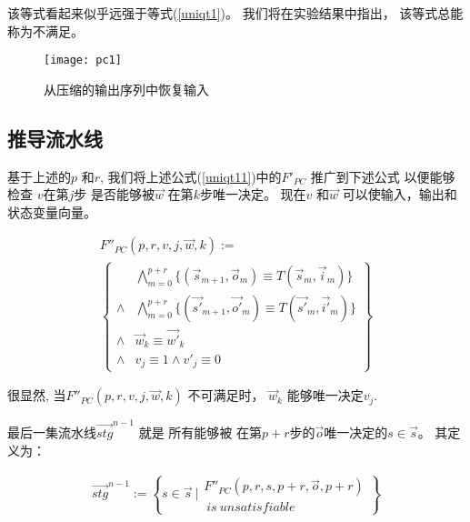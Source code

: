 该等式看起来似乎远强于等式(\ref{uniqt1})。
我们将在实验结果中指出，
该等式总能称为不满足。

\begin{figure}[t]
\begin{center}
\texttt{[image: pc1]}
\end{center}
\caption{从压缩的输出序列中恢复输入}
  \label{fig_pc1}
\end{figure}

\subsection{推导流水线}\label{subsec_inferstage}

基于上述的$p$ 和$r$,
我们将上述公式(\ref{uniqt11})中的$F'_{PC}$ 推广到下述公式
以便能够检查 $v$在第$j$步
是否能够被$\vec{w}$ 在第$k$步唯一决定。
现在$v$ 和$\vec{w}$ 可以使输入，输出和状态变量向量。

\begin{multline}\label{uniqt2}
F''_{PC}(p,r,v,j,\vec{w},k):=\\
\left\{
\begin{array}{cc}
&\bigwedge_{m=0}^{p+r}
\{
(\vec{s}_{m+1},\vec{o}_m)\equiv T(\vec{s}_m,\vec{i}_m)
\}
\\
\wedge&\bigwedge_{m=0}^{p+r}
\{
(\vec{s'}_{m+1},\vec{o'}_m)\equiv T(\vec{s'}_m,\vec{i'}_m)
\}
\\
\wedge&\vec{w}_{k}\equiv \vec{w'}_{k} \\
\wedge& v_{j}\equiv 1 \wedge  v'_{j}\equiv 0
\end{array}
\right\}
\end{multline}

很显然,
当$F''_{PC}(p,r,v,j,\vec{w},k)$ 不可满足时，
$\vec{w}_k$ 能够唯一决定$v_j$.

最后一集流水线$\vec{stg}^{n-1}$ 就是
所有能够被
在第$p+r$步的$\vec{o}$唯一决定的$s\in \vec{s}$。
其定义为：

\begin{multline}\label{stgn_1}
 \vec{stg}^{n-1} :=
\left\{
 s\in \vec{s} ~|
\begin{array}{cc}
 F''_{PC}(p,r,
 s,p+r,
 \vec{o},p+r)\\
 ~is~unsatisfiable
\end{array}
\right\}
\end{multline}


